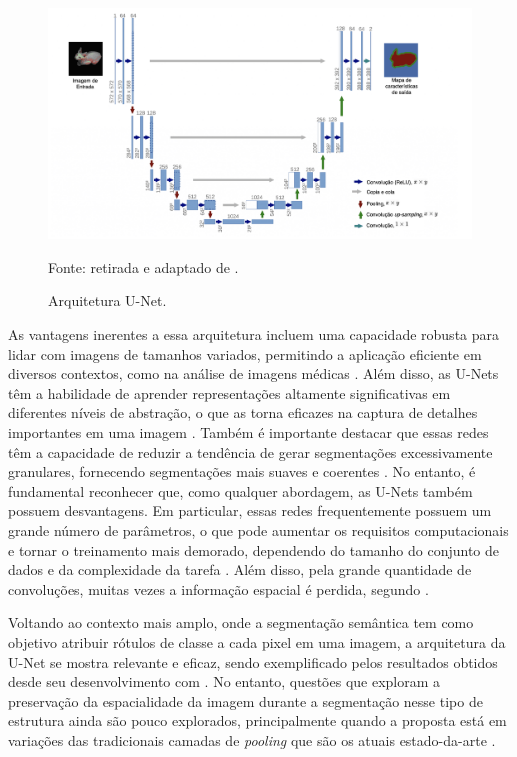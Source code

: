 \begin{figure}[H]
    \centering
    \caption{Arquitetura U-Net.}
    \includegraphics[width=1\linewidth]{recursos/imagens/semantic/unet-arch.png}
    \label{semantic:fig:unet}

    Fonte: retirada e adaptado de \cite{Ronneberger2015U-net:Segmentation}.
\end{figure}

As vantagens inerentes a essa arquitetura incluem uma capacidade robusta para lidar com imagens de tamanhos variados, permitindo a aplicação eficiente em diversos contextos, como na análise de imagens médicas \citep{Ronneberger2015U-net:Segmentation}. Além disso, as U-Nets têm a habilidade de aprender representações altamente significativas em diferentes níveis de abstração, o que as torna eficazes na captura de detalhes importantes em uma imagem \citep{Alom2019RecurrentSegmentation}. Também é importante destacar que essas redes têm a capacidade de reduzir a tendência de gerar segmentações excessivamente granulares, fornecendo segmentações mais suaves e coerentes \citep{Du2020MedicalReview}. No entanto, é fundamental reconhecer que, como qualquer abordagem, as U-Nets também possuem desvantagens. Em particular, essas redes frequentemente possuem um grande número de parâmetros, o que pode aumentar os requisitos computacionais e tornar o treinamento mais demorado, dependendo do tamanho do conjunto de dados e da complexidade da tarefa \citep{Ronneberger2015U-net:Segmentation}. Além disso, pela grande quantidade de convoluções, muitas vezes a informação espacial é perdida, segundo \cite{Zhang2023LcmUNet:Segmentation}.

Voltando ao contexto mais amplo, onde a segmentação semântica tem como objetivo atribuir rótulos de classe a cada pixel em uma imagem, a arquitetura da U-Net se mostra relevante e eficaz, sendo exemplificado pelos resultados obtidos desde seu desenvolvimento com \cite{Ronneberger2015U-net:Segmentation}. No entanto, questões que exploram a preservação da espacialidade da imagem durante a segmentação nesse tipo de estrutura ainda são pouco explorados, principalmente quando a proposta está em variações das tradicionais camadas de \textit{pooling} que são os atuais estado-da-arte \citep{Minaee2021}.

